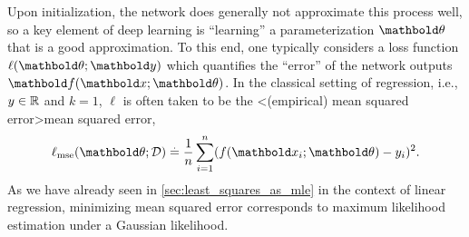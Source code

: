Upon initialization, the network does generally not approximate this process well, so a key element of deep learning is ``learning'' a parameterization $\vtheta$ that is a good approximation.
To this end, one typically considers a loss function $\ell(\vtheta; \vy)$ which quantifies the ``error'' of the network outputs $\vf(\vx; \vtheta)$.
In the classical setting of regression, i.e., $y \in \mathbb{R}$ and $k = 1$, $\ell$ is often taken to be the \midx<(empirical) mean squared error>{mean squared error}, \begin{align}
  \ell_\MSE(\vtheta; \spD) \defeq \frac{1}{n} \sum_{i=1}^n (f(\vx_i; \vtheta) - y_i)^2.
\end{align}
As we have already seen in \cref{sec:least_squares_as_mle} in the context of linear regression, minimizing mean squared error corresponds to maximum likelihood estimation under a Gaussian likelihood.

